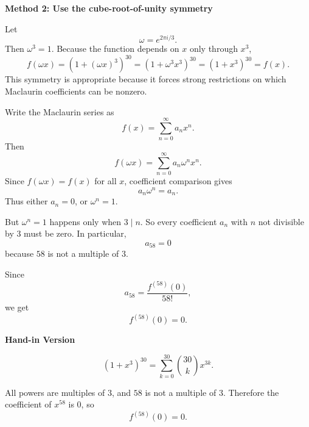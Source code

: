 \documentclass[a4paper,12pt,twocolumn]{article}
\newenvironment{solutionbox}{\begin{framed}}{\end{framed}}
\begin{document}
\begin{solutionbox}
\textbf{Method 2: Use the cube-root-of-unity symmetry}

\begin{steps}
\item Let
\[
\omega=e^{2\pi i/3}.
\]
Then \(\omega^3=1\). Because the function depends on \(x\) only through \(x^3\),
\[
f(\omega x)=(1+(\omega x)^3)^{30}=(1+\omega^3 x^3)^{30}=(1+x^3)^{30}=f(x).
\]
This symmetry is appropriate because it forces strong restrictions on which Maclaurin coefficients can be nonzero.

\item Write the Maclaurin series as
\[
f(x)=\sum_{n=0}^{\infty}a_n x^n.
\]
Then
\[
f(\omega x)=\sum_{n=0}^{\infty}a_n \omega^n x^n.
\]
Since \(f(\omega x)=f(x)\) for all \(x\), coefficient comparison gives
\[
a_n\omega^n=a_n.
\]
Thus either \(a_n=0\), or \(\omega^n=1\).

\item But \(\omega^n=1\) happens only when \(3\mid n\). So every coefficient \(a_n\) with \(n\) not divisible by \(3\) must be zero. In particular,
\[
a_{58}=0
\]
because \(58\) is not a multiple of \(3\).

\item Since
\[
a_{58}=\frac{f^{(58)}(0)}{58!},
\]
we get
\[
\boxed{f^{(58)}(0)=0}.
\]
\end{steps}
\end{solutionbox}

\begin{solutionbox}
\textbf{Hand-in Version}

\[
(1+x^3)^{30}=\sum_{k=0}^{30}\binom{30}{k}x^{3k}.
\]

All powers are multiples of \(3\), and \(58\) is not a multiple of \(3\). Therefore the coefficient of \(x^{58}\) is \(0\), so
\[
\boxed{f^{(58)}(0)=0}.
\]
\end{solutionbox}
\end{document}
